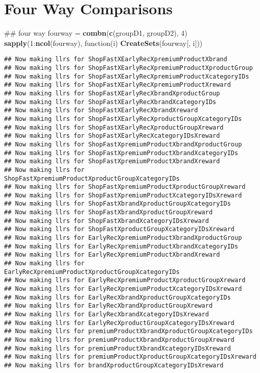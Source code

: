 \documentclass[10pt]{report}
\newenvironment{Shaded}{}{}
\newcommand{\KeywordTok}[1]{\textcolor[rgb]{0.00,0.44,0.13}{\textbf{{#1}}}}
\newcommand{\DecValTok}[1]{\textcolor[rgb]{0.25,0.63,0.44}{{#1}}}
\newcommand{\StringTok}[1]{\textcolor[rgb]{0.25,0.44,0.63}{{#1}}}
\newcommand{\NormalTok}[1]{{#1}}
\begin{document}
\section{Four Way Comparisons}\label{four-way-comparisons}

\begin{Shaded}
\begin{Highlighting}[]
\NormalTok{## four way}
\NormalTok{fourway =}\StringTok{ }\KeywordTok{combn}\NormalTok{(}\KeywordTok{c}\NormalTok{(groupD1, groupD2), }\DecValTok{4}\NormalTok{)}
\KeywordTok{sapply}\NormalTok{(}\DecValTok{1}\NormalTok{:}\KeywordTok{ncol}\NormalTok{(fourway), function(i) }\KeywordTok{CreateSets}\NormalTok{(fourway[, i]))}
\end{Highlighting}
\end{Shaded}

\begin{verbatim}
## Now making llrs for ShopFastXEarlyRecXpremiumProductXbrand
## Now making llrs for ShopFastXEarlyRecXpremiumProductXproductGroup
## Now making llrs for ShopFastXEarlyRecXpremiumProductXcategoryIDs
## Now making llrs for ShopFastXEarlyRecXpremiumProductXreward
## Now making llrs for ShopFastXEarlyRecXbrandXproductGroup
## Now making llrs for ShopFastXEarlyRecXbrandXcategoryIDs
## Now making llrs for ShopFastXEarlyRecXbrandXreward
## Now making llrs for ShopFastXEarlyRecXproductGroupXcategoryIDs
## Now making llrs for ShopFastXEarlyRecXproductGroupXreward
## Now making llrs for ShopFastXEarlyRecXcategoryIDsXreward
## Now making llrs for ShopFastXpremiumProductXbrandXproductGroup
## Now making llrs for ShopFastXpremiumProductXbrandXcategoryIDs
## Now making llrs for ShopFastXpremiumProductXbrandXreward
## Now making llrs for ShopFastXpremiumProductXproductGroupXcategoryIDs
## Now making llrs for ShopFastXpremiumProductXproductGroupXreward
## Now making llrs for ShopFastXpremiumProductXcategoryIDsXreward
## Now making llrs for ShopFastXbrandXproductGroupXcategoryIDs
## Now making llrs for ShopFastXbrandXproductGroupXreward
## Now making llrs for ShopFastXbrandXcategoryIDsXreward
## Now making llrs for ShopFastXproductGroupXcategoryIDsXreward
## Now making llrs for EarlyRecXpremiumProductXbrandXproductGroup
## Now making llrs for EarlyRecXpremiumProductXbrandXcategoryIDs
## Now making llrs for EarlyRecXpremiumProductXbrandXreward
## Now making llrs for EarlyRecXpremiumProductXproductGroupXcategoryIDs
## Now making llrs for EarlyRecXpremiumProductXproductGroupXreward
## Now making llrs for EarlyRecXpremiumProductXcategoryIDsXreward
## Now making llrs for EarlyRecXbrandXproductGroupXcategoryIDs
## Now making llrs for EarlyRecXbrandXproductGroupXreward
## Now making llrs for EarlyRecXbrandXcategoryIDsXreward
## Now making llrs for EarlyRecXproductGroupXcategoryIDsXreward
## Now making llrs for premiumProductXbrandXproductGroupXcategoryIDs
## Now making llrs for premiumProductXbrandXproductGroupXreward
## Now making llrs for premiumProductXbrandXcategoryIDsXreward
## Now making llrs for premiumProductXproductGroupXcategoryIDsXreward
## Now making llrs for brandXproductGroupXcategoryIDsXreward
\end{verbatim}
\end{document}
